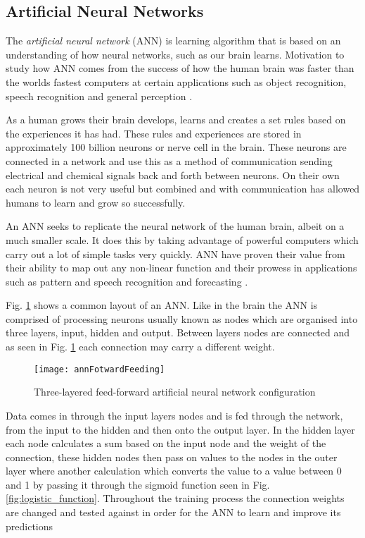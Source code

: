 \subsection{Artificial Neural Networks} \label{neuralNets}
The \textit{artificial neural network} (ANN) is learning algorithm that is based on an understanding of how neural networks, such as our brain learns. Motivation to study how ANN comes from the success of how the human brain was faster than the worlds fastest computers at certain applications such as object recognition, speech recognition and general perception \citep{haykin_neural_1998}.

As a human grows their brain develops, learns and creates a set rules based on the experiences it has had. These rules and experiences are stored in approximately 100 billion neurons or nerve cell in the brain. These neurons are connected in a network and use this as a method of communication sending electrical and chemical signals back and forth between neurons. On their own each neuron is not very useful but combined and with communication has allowed humans to learn and grow so successfully. 

An ANN seeks to replicate the neural network of the human brain, albeit on a much smaller scale. It does this by taking advantage of powerful computers which carry out a lot of simple tasks very quickly. ANN have proven their value from their ability to map out any non-linear function \citep{white_learning_1989} and their prowess in applications such as pattern and speech recognition and forecasting \citep{kaastra_forecasting_1995}.

Fig. \ref{fig:annFotwardFeeding} shows a common layout of an ANN. Like in the brain the ANN is comprised of processing neurons usually known as nodes which are organised into three layers, input, hidden and output. Between layers nodes are connected and as seen in Fig. \ref{fig:annFotwardFeeding} each connection may carry a different weight.

\begin{figure}[H]
	\texttt{[image: annFotwardFeeding]}
	\caption{Three-layered feed-forward artificial neural network configuration \\
				\cite[Source:][]{raju_development_2011}
			}
	\label{fig:annFotwardFeeding}
\end{figure}

Data comes in through the input layers nodes and is fed through the network, from the input to the hidden and then onto the output layer. In the hidden layer each node calculates a sum based on the input node and the weight of the connection, these hidden nodes then pass on values to the nodes in the outer layer where another calculation which converts the value to a value between 0 and 1 by passing it through the sigmoid function seen in Fig. \ref{fig:logistic_function}. Throughout the training process the connection weights are changed and tested against in order for the ANN to learn and improve its predictions \citep{haykin_neural_1998}

